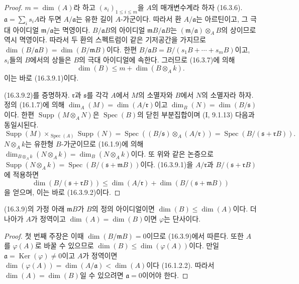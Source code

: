 \begin{proof}
$m=\dim(A)$라 하고 $(s_i)_{1\leq i\leq m}$을 $A$의 매개변수계라
하자 (16.3.6). $\mathfrak{a}=\sum_i s_iA$라 두면
$A/\mathfrak{a}$는 유한 길이 $A$-가군이다. 따라서 환
$A/\mathfrak{a}$는 아르틴이고, 그 극대 아이디얼
$\mathfrak{m}/\mathfrak{a}$는 멱영이다. $B/\mathfrak{a}B$의
아이디얼 $\mathfrak{m}B/\mathfrak{a}B$는
$(\mathfrak{m}/\mathfrak{a})\otimes_A B$의 상이므로 역시 멱영이다.
따라서 두 환의 스펙트럼이 같은 기저공간을 가지므로
$\dim(B/\mathfrak{a}B)=\dim(B/\mathfrak{m}B)$이다. 한편
$B/\mathfrak{a}B=B/(s_1B+\cdots+s_mB)$이고, $s_i$들의 $B$에서의
상들은 $B$의 극대 아이디얼에 속한다. 그러므로 (16.3.7)에 의해
\[
  \dim(B)\leq m+\dim(B\otimes_A k).
\]
이는 바로 (16.3.9.1)이다.

(16.3.9.2)를 증명하자. $\mathfrak{r}$과 $\mathfrak{s}$를 각각
$A$에서 $M$의 소멸자와 $B$에서 $N$의 소멸자라 하자.
정의 (16.1.7)에 의해 $\dim_A(M)=\dim(A/\mathfrak{r})$이고
$\dim_B(N)=\dim(B/\mathfrak{s})$이다. 한편
$\operatorname{Supp}(M\otimes_A N)$은 $\operatorname{Spec}(B)$의
닫힌 부분집합이며 (I, 9.1.13) 다음과 동일시된다.
\[
  \operatorname{Supp}(M)\times_{\operatorname{Spec}(A)}
  \operatorname{Supp}(N)
  =\operatorname{Spec}((B/\mathfrak{s})\otimes_A(A/\mathfrak{r}))
  =\operatorname{Spec}(B/(\mathfrak{s}+\mathfrak{r}B)).
\]
$N\otimes_A k$는 유한형 $B$-가군이므로 (16.1.9)에 의해
$\dim_{B\otimes_A k}(N\otimes_A k)=\dim_B(N\otimes_A k)$이다.
또 위와 같은 논증으로
$\operatorname{Supp}(N\otimes_A k)
=\operatorname{Spec}(B/(\mathfrak{s}+\mathfrak{m}B))$이다.
(16.3.9.1)을 $A/\mathfrak{r}$과
$B/(\mathfrak{s}+\mathfrak{r}B)$에 적용하면
\[
  \dim(B/(\mathfrak{s}+\mathfrak{r}B))
  \leq\dim(A/\mathfrak{r})+
  \dim(B/(\mathfrak{s}+\mathfrak{m}B))
\]
을 얻으며, 이는 바로 (16.3.9.2)이다.
\end{proof}

\begin{corollary}[16.3.10]
\label{0.16.3.10-fr}
(16.3.9)의 가정 아래 $\mathfrak{m}B$가 $B$의 정의 아이디얼이면
$\dim(B)\leq\dim(A)$이다. 더 나아가 $A$가 정역이고
$\dim(A)=\dim(B)$이면 $\varphi$는 단사이다.
\end{corollary}

\begin{proof}
첫 번째 주장은 이때 $\dim(B/\mathfrak{m}B)=0$이므로 (16.3.9)에서
따른다. 또한 $A$를 $\varphi(A)$로 바꿀 수 있으므로
$\dim(B)\leq\dim(\varphi(A))$이다. 만일
$\mathfrak{a}=\operatorname{Ker}(\varphi)\neq0$이고 $A$가 정역이면
$\dim(\varphi(A))=\dim(A/\mathfrak{a})<\dim(A)$이다 (16.1.2.2).
따라서 $\dim(A)=\dim(B)$일 수 있으려면
$\mathfrak{a}=0$이어야 한다.
\end{proof}


